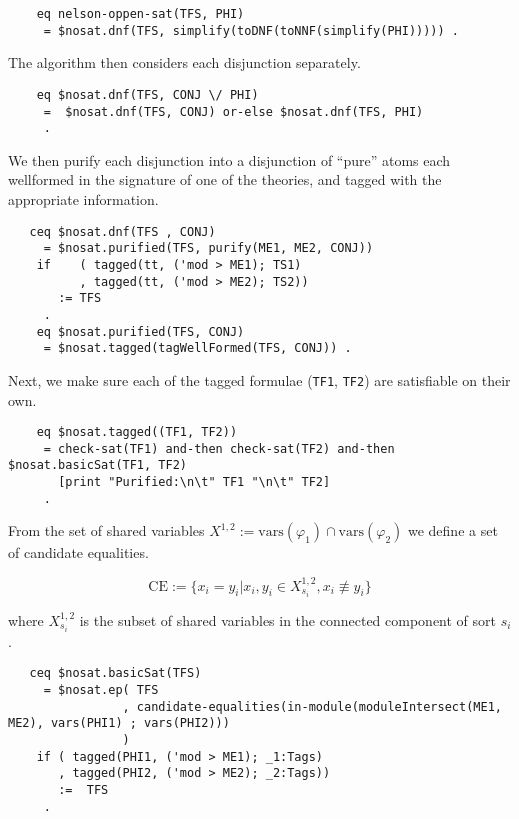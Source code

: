 \documentclass[]{article}
\renewcommand \phi {\varphi}
\newcommand \intersect  {\cap }
\newcommand \vars     {\text{vars}}
\newcommand \SharedVariables {X^{1, 2}}
\newcommand \CandidateEqualities {\text{CE}}
\begin{document}
\begin{verbatim}
    eq nelson-oppen-sat(TFS, PHI)
     = $nosat.dnf(TFS, simplify(toDNF(toNNF(simplify(PHI))))) .
\end{verbatim}

The algorithm then considers each disjunction separately.

\begin{verbatim}
    eq $nosat.dnf(TFS, CONJ \/ PHI)
     =  $nosat.dnf(TFS, CONJ) or-else $nosat.dnf(TFS, PHI)
     .
\end{verbatim}

We then purify each disjunction into a disjunction of ``pure'' atoms
each wellformed in the signature of one of the theories, and tagged with
the appropriate information.

\begin{verbatim}
   ceq $nosat.dnf(TFS , CONJ)
     = $nosat.purified(TFS, purify(ME1, ME2, CONJ))
    if    ( tagged(tt, ('mod > ME1); TS1)
          , tagged(tt, ('mod > ME2); TS2))
       := TFS
     .
    eq $nosat.purified(TFS, CONJ)
     = $nosat.tagged(tagWellFormed(TFS, CONJ)) .
\end{verbatim}

Next, we make sure each of the tagged formulae (\texttt{TF1},
\texttt{TF2}) are satisfiable on their own.

\begin{verbatim}
    eq $nosat.tagged((TF1, TF2))
     = check-sat(TF1) and-then check-sat(TF2) and-then $nosat.basicSat(TF1, TF2)
       [print "Purified:\n\t" TF1 "\n\t" TF2]
     .
\end{verbatim}

From the set of shared variables
\(\SharedVariables := \vars(\phi_1) \intersect \vars(\phi_2)\) we define
a set of candidate equalities.

\[\CandidateEqualities := \{ x_i = y_i | x_i, y_i \in \SharedVariables_{s_i}, x_i \not\equiv y_i \}\]

where \(\SharedVariables_{s_i}\) is the subset of shared variables in
the connected component of sort \(s_i\).

\begin{verbatim}
   ceq $nosat.basicSat(TFS)
     = $nosat.ep( TFS
                , candidate-equalities(in-module(moduleIntersect(ME1, ME2), vars(PHI1) ; vars(PHI2)))
                )
    if ( tagged(PHI1, ('mod > ME1); _1:Tags)
       , tagged(PHI2, ('mod > ME2); _2:Tags))
       :=  TFS
     .
\end{verbatim}
\end{document}
